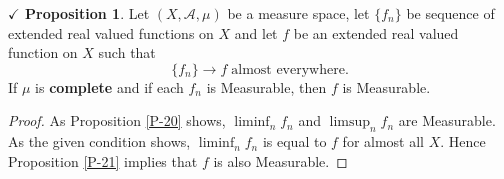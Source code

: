 \documentclass{article}
\theoremstyle{definition}
\theoremstyle{remark}
\theoremstyle{definition}
\theoremstyle{definition}
\newtheorem{proposition}{$\checkmark$ Proposition}
\theoremstyle{definition}
\newcommand{\alg}[1]{\mathscr{#1}}
\begin{document}
\hrulefill
\begin{proposition}
	Let $ (X,\alg{A},\mu) $ be a measure space, let $ \{f_n\} $ be sequence of extended real valued functions on $ X $ and let $ f $ be an extended real valued function on $ X $ such that
	\[\{f_n\}\longrightarrow f\;\text{almost everywhere.}\]
	If $ \mu  $ is \textbf{complete} and if each $ f_n $ is Measurable, then $ f $ is Measurable.
\end{proposition}
\begin{proof}
	As Proposition \ref{P-20} shows, $ \liminf_n f_n $ and $ \limsup_{n} f_n $ are Measurable. As the given condition shows, $ \liminf_{n}f_n $ is equal to $ f $ for almost all $ X $. Hence Proposition \ref{P-21} implies that $ f $ is also Measurable.
\end{proof}
\hrulefill

\newpage
\end{document}
